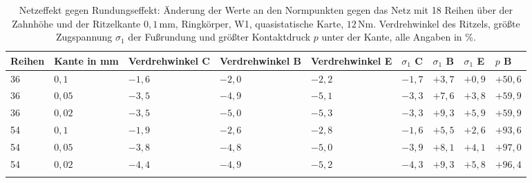 \begin{table}[htbp]
    \caption{Netzeffekt gegen Rundungseffekt: Änderung der Werte an den Normpunkten gegen das Netz mit 18 Reihen über der Zahnhöhe und der Ritzelkante $0{,}1$\,mm, Ringkörper, W1, quasistatische Karte, $12$\,Nm. Verdrehwinkel des Ritzels, größte Zugspannung $\sigma_{\mathrm{1}}$ der Fußrundung und größter Kontaktdruck $p$ unter der Kante, alle Angaben in \%.}
    \label{tab:netz_rundung}
    \centering
    \footnotesize
    \setlength{\tabcolsep}{3pt}
    \begin{tabular}{lllllllll}
        Reihen & Kante in mm & Verdrehwinkel C & Verdrehwinkel B & Verdrehwinkel E & $\sigma_{\mathrm{1}}$ C & $\sigma_{\mathrm{1}}$ B & $\sigma_{\mathrm{1}}$ E & $p$ B     \\
        \hline
        \arrayrulecolor{black!30}
        36     & $0{,}1$     & $-1{,}6$  & $-2{,}0$  & $-2{,}2$  & $-1{,}7$                & $+3{,}7$                & $+0{,}9$                & $+50{,}6$ \\
        \hline
        36     & $0{,}05$    & $-3{,}5$  & $-4{,}9$  & $-5{,}1$  & $-3{,}3$                & $+7{,}6$                & $+3{,}8$                & $+59{,}9$ \\
        \hline
        36     & $0{,}02$    & $-3{,}5$  & $-5{,}0$  & $-5{,}3$  & $-3{,}3$                & $+9{,}3$                & $+5{,}9$                & $+59{,}9$ \\
        \hline
        54     & $0{,}1$     & $-1{,}9$  & $-2{,}6$  & $-2{,}8$  & $-1{,}6$                & $+5{,}5$                & $+2{,}6$                & $+93{,}6$ \\
        \hline
        54     & $0{,}05$    & $-3{,}8$  & $-4{,}8$  & $-5{,}0$  & $-3{,}9$                & $+8{,}1$                & $+4{,}1$                & $+97{,}0$ \\
        \hline
        54     & $0{,}02$    & $-4{,}4$  & $-4{,}9$  & $-5{,}2$  & $-4{,}3$                & $+9{,}3$                & $+5{,}8$                & $+96{,}4$ \\
        \hline
        \arrayrulecolor{black}
    \end{tabular}
\end{table}


